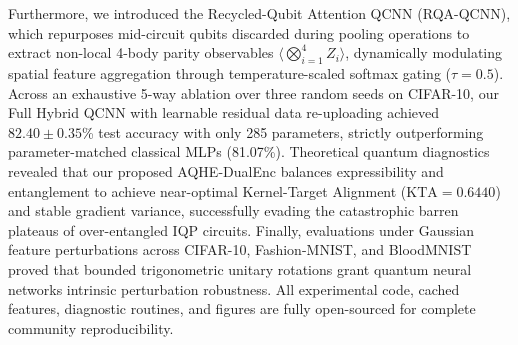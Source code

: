 \documentclass[10pt,twocolumn,twoside,a4paper]{article}
\begin{document}
Furthermore, we introduced the Recycled-Qubit Attention QCNN (RQA-QCNN), which repurposes mid-circuit qubits discarded during pooling operations to extract non-local 4-body parity observables $\langle \bigotimes_{i=1}^4 Z_i \rangle$, dynamically modulating spatial feature aggregation through temperature-scaled softmax gating ($\tau=0.5$). Across an exhaustive 5-way ablation over three random seeds on CIFAR-10, our Full Hybrid QCNN with learnable residual data re-uploading achieved $82.40 \pm 0.35$\% test accuracy with only 285 parameters, strictly outperforming parameter-matched classical MLPs (81.07\%). Theoretical quantum diagnostics revealed that our proposed AQHE-DualEnc balances expressibility and entanglement to achieve near-optimal Kernel-Target Alignment ($\text{KTA}=0.6440$) and stable gradient variance, successfully evading the catastrophic barren plateaus of over-entangled IQP circuits. Finally, evaluations under Gaussian feature perturbations across CIFAR-10, Fashion-MNIST, and BloodMNIST proved that bounded trigonometric unitary rotations grant quantum neural networks intrinsic perturbation robustness. All experimental code, cached features, diagnostic routines, and figures are fully open-sourced for complete community reproducibility.
\end{document}
